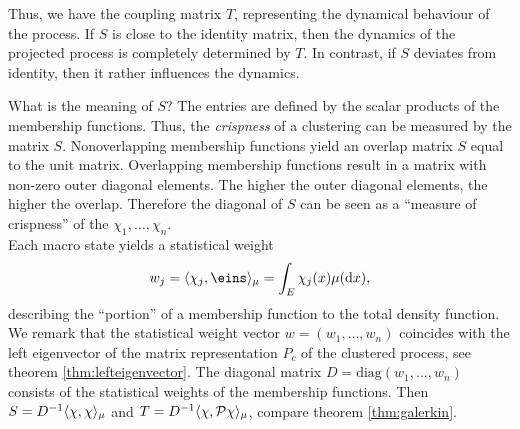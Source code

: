 Thus, we have the coupling matrix $T$, representing the dynamical behaviour of the process.
If $S$ is close to the identity matrix, then the dynamics of the projected process is completely determined by $T$. In contrast, if $S$ deviates from identity, then it rather influences the dynamics.

What is the meaning of $S$? The entries are defined by the scalar products of the membership functions.
Thus, the \textit{crispness} of a clustering can be measured by the matrix $S$.
Nonoverlapping membership functions yield an overlap matrix $S$ equal to the unit matrix.
Overlapping membership functions result in a matrix with non-zero outer diagonal elements.
The higher the outer diagonal elements, the higher the overlap.
Therefore the diagonal of $S$ can be seen as a ``measure of crispness'' of the $\chi_1,\dots,\chi_n$. %
\\


Each macro state yields a statistical weight
\begin{equation*}
w_j = \langle \chi_j, \eins \rangle_\mu = \int_E \chi_j(x) \mu(\diff x),
\end{equation*}
describing the ``portion'' of a membership function to the total density function. 
We remark that the statistical weight vector $w = (w_1, \dots, w_n)$ coincides with the left eigenvector of the matrix representation $P_c$ of the clustered process, see theorem \ref{thm:lefteigenvector}.
The diagonal matrix $D = \mathrm{diag}(w_1,\dots,w_n)$ consists of the statistical weights of the membership functions. Then $S = D^{-1} \langle \chi, \chi \rangle_\mu$ and $T=D^{-1} \langle \chi, \mathcal{P} \chi \rangle_\mu$, compare theorem \ref{thm:galerkin}. %


